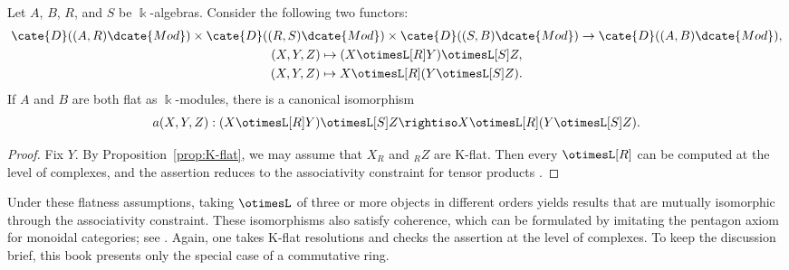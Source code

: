 \begin{proposition}\label{prop:otimesL-associativity-constraint}
	Let $A$, $B$, $R$, and $S$ be $\Bbbk$-algebras. Consider the following two
	functors:
	\begin{gather*}
		\cate{D}((A,R)\dcate{Mod}) \times \cate{D}((R,S)\dcate{Mod}) \times \cate{D}((S,B)\dcate{Mod}) \to \cate{D}((A,B)\dcate{Mod}), \\
		(X, Y, Z) \mapsto (X \otimesL[R] Y) \otimesL[S] Z, \\
		(X, Y, Z) \mapsto X \otimesL[R] (Y \otimesL[S] Z).
	\end{gather*}
	If $A$ and $B$ are both flat as $\Bbbk$-modules, there is a canonical
	isomorphism
	\[ a(X,Y,Z): (X \otimesL[R] Y) \otimesL[S] Z \rightiso X \otimesL[R] (Y \otimesL[S] Z). \]
\end{proposition}
\begin{proof}
	Fix $Y$. By Proposition~\ref{prop:K-flat}, we may assume that $X_R$ and
	${}_R Z$ are K-flat. Then every $\otimesL[R]$ can be computed at the level
	of complexes, and the assertion reduces to the associativity constraint for
	tensor products \cite[Proposition 6.5.12]{Li1}.
\end{proof}

Under these flatness assumptions, taking $\otimesL$ of three or more objects
in different orders yields results that are mutually isomorphic through the
associativity constraint. These isomorphisms also satisfy coherence, which can
be formulated by imitating the pentagon axiom for monoidal categories; see
\cite[Definition 3.1.1]{Li1}. Again, one takes K-flat resolutions and checks
the assertion at the level of complexes. To keep the discussion brief, this
book presents only the special case of a commutative ring.


